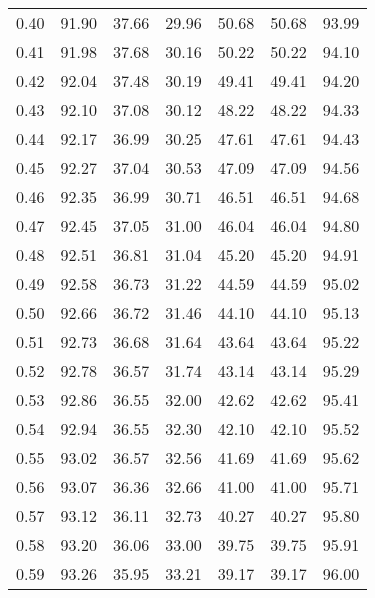 \begin{tabular}{|c|c|c|c|c|c|c|}
      0.40 &     91.90 &     37.66 &      29.96 &   50.68 &      50.68 &         93.99 \\
      0.41 &     91.98 &     37.68 &      30.16 &   50.22 &      50.22 &         94.10 \\
      0.42 &     92.04 &     37.48 &      30.19 &   49.41 &      49.41 &         94.20 \\
      0.43 &     92.10 &     37.08 &      30.12 &   48.22 &      48.22 &         94.33 \\
      0.44 &     92.17 &     36.99 &      30.25 &   47.61 &      47.61 &         94.43 \\
      0.45 &     92.27 &     37.04 &      30.53 &   47.09 &      47.09 &         94.56 \\
      0.46 &     92.35 &     36.99 &      30.71 &   46.51 &      46.51 &         94.68 \\
      0.47 &     92.45 &     37.05 &      31.00 &   46.04 &      46.04 &         94.80 \\
      0.48 &     92.51 &     36.81 &      31.04 &   45.20 &      45.20 &         94.91 \\
      0.49 &     92.58 &     36.73 &      31.22 &   44.59 &      44.59 &         95.02 \\
      0.50 &     92.66 &     36.72 &      31.46 &   44.10 &      44.10 &         95.13 \\
      0.51 &     92.73 &     36.68 &      31.64 &   43.64 &      43.64 &         95.22 \\
      0.52 &     92.78 &     36.57 &      31.74 &   43.14 &      43.14 &         95.29 \\
      0.53 &     92.86 &     36.55 &      32.00 &   42.62 &      42.62 &         95.41 \\
      0.54 &     92.94 &     36.55 &      32.30 &   42.10 &      42.10 &         95.52 \\
      0.55 &     93.02 &     36.57 &      32.56 &   41.69 &      41.69 &         95.62 \\
      0.56 &     93.07 &     36.36 &      32.66 &   41.00 &      41.00 &         95.71 \\
      0.57 &     93.12 &     36.11 &      32.73 &   40.27 &      40.27 &         95.80 \\
      0.58 &     93.20 &     36.06 &      33.00 &   39.75 &      39.75 &         95.91 \\
      0.59 &     93.26 &     35.95 &      33.21 &   39.17 &      39.17 &         96.00 \\

\end{tabular}
